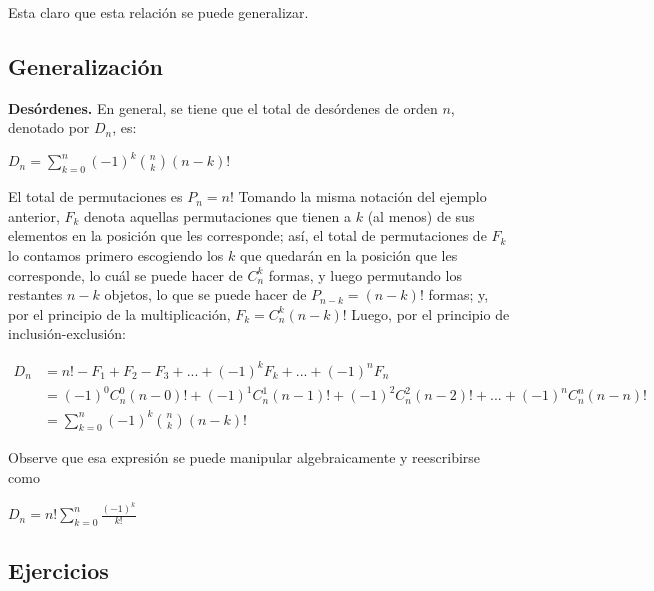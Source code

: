 Esta claro que esta relación se puede generalizar.

\subsection{Generalización}

\begin{teorema}
    \textbf{Desórdenes.} En general, se tiene que el total de desórdenes de orden $n$, denotado por $D_n$, es:

    \begin{center}
        $D_n = \displaystyle\sum_{k=0}^{n} (-1)^{k} \binom{n}{k} (n-k)!$
    \end{center}
\end{teorema}

\begin{demostracion}
    El total de permutaciones es $P_n = n!$ Tomando la misma notación del ejemplo anterior, $F_k$ denota aquellas permutaciones que tienen a $k$ (al menos) de sus elementos en la posición que les corresponde; así, el total de permutaciones de $F_k$ lo contamos primero escogiendo los $k$ que quedarán en la posición que les corresponde, lo cuál se puede hacer de $C^k_n$ formas, y luego permutando los restantes $n-k$ objetos, lo que se puede hacer de $P_{n-k}= (n-k)!$ formas; y, por el principio de la multiplicación, $F_k = C^k_n (n-k)!$ Luego, por el principio de inclusión-exclusión:

    \begin{align*}
        D_n & = n!-F_1+F_2-F_3+ ... + (-1)^k F_k + ... + (-1)^n F_n \\
        & = (-1)^0 C^0_n (n-0)! + (-1)^1 C^1_n (n-1)! + (-1)^2 C^2_n (n-2)! + ... + (-1)^n C^n_n (n-n)! \\
        & = \displaystyle\sum_{k=0}^{n} (-1)^{k} \binom{n}{k} (n-k)!
    \end{align*}
\end{demostracion}

Observe que esa expresión se puede manipular algebraicamente y reescribirse como

\begin{center}
    $D_n = n! \displaystyle\sum_{k=0}^{n} \frac{(-1)^{k}}{k!}$
\end{center}

\subsection{Ejercicios}

